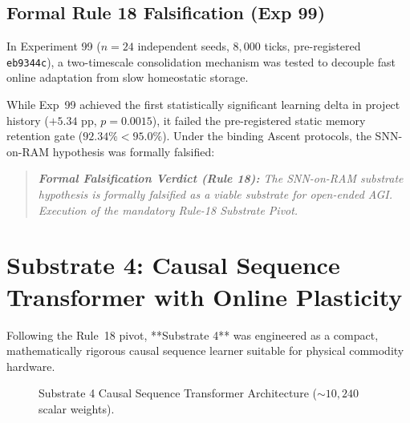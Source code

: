 \documentclass[10pt,journal,compsoc]{IEEEtran}
\begin{document}
\subsection{Formal Rule 18 Falsification (Exp 99)}
In Experiment 99 ($n=24$ independent seeds, $8,000$ ticks, pre-registered \texttt{eb9344c}), a two-timescale consolidation mechanism was tested to decouple fast online adaptation from slow homeostatic storage.

While Exp~99 achieved the first statistically significant learning delta in project history ($+5.34\text{ pp}$, $p = 0.0015$), it failed the pre-registered static memory retention gate ($92.34\% < 95.0\%$). Under the binding Ascent protocols, the SNN-on-RAM hypothesis was formally falsified:
\begin{quote}
\textit{\textbf{Formal Falsification Verdict (Rule 18):} The SNN-on-RAM substrate hypothesis is formally falsified as a viable substrate for open-ended AGI. Execution of the mandatory Rule-18 Substrate Pivot.}
\end{quote}

\section{Substrate 4: Causal Sequence Transformer with Online Plasticity}
\label{sec:sub4}

Following the Rule~18 pivot, **Substrate 4** was engineered as a compact, mathematically rigorous causal sequence learner suitable for physical commodity hardware.

\begin{figure}[!ht]
\centering
{}
\caption{Substrate 4 Causal Sequence Transformer Architecture ($\sim 10,240$ scalar weights).}
\label{fig:sub4_arch}
\end{figure}
\end{document}
